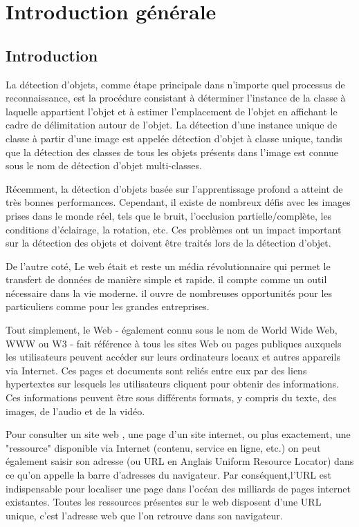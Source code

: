 \chapter*{Introduction générale}
\newpage
\pagestyle{fancy}
\fancyhead[L]{}
\renewcommand{\headrulewidth}{1pt}
\fancyfoot[C]{\thepage}


\section*{Introduction}
La détection d'objets, comme étape principale dans n'importe quel processus  de reconnaissance, est la procédure consistant à déterminer l'instance de la classe à laquelle appartient l'objet et à estimer l'emplacement de l'objet en affichant le cadre de délimitation autour de l'objet. La détection d'une instance unique de classe à partir d'une image est appelée détection d'objet à classe unique, tandis que la détection des classes de tous les objets présents dans l'image est connue sous le nom de détection d'objet multi-classes. 

Récemment, la détection d'objets basée sur l'apprentissage profond a atteint de très bonnes performances. Cependant, il existe de nombreux défis avec les images prises dans le monde réel, tels que le bruit, l'occlusion partielle/complète, les conditions d'éclairage, la rotation, etc. Ces problèmes ont un impact important sur la détection des objets et doivent être traités lors de la détection d'objet. 

De l'autre coté, Le web était et reste un média révolutionnaire qui permet le transfert de données de manière simple et rapide. il compte comme un outil nécessaire dans la vie moderne. il ouvre de nombreuses opportunités pour les particuliers comme pour les grandes entreprises. 

Tout simplement, le Web - également connu sous le nom de World Wide Web, WWW ou W3 - fait référence à tous les sites Web ou pages publiques auxquels les utilisateurs peuvent accéder sur leurs ordinateurs locaux et autres appareils via Internet. Ces pages et documents sont reliés entre eux par des liens hypertextes sur lesquels les utilisateurs cliquent pour obtenir des informations. Ces informations peuvent être sous différents formats, y compris du texte, des images, de l'audio et de la vidéo.

Pour consulter un site web , une page d'un site internet, ou plus exactement, une "ressource" disponible via Internet (contenu, service en ligne, etc.) on peut également saisir son adresse (ou URL en Anglais Uniform Resource Locator) dans ce qu’on appelle la barre d'adresses du navigateur. Par conséquent,l'URL est indispensable pour localiser une page dans l'océan des milliards de pages internet existantes.  Toutes les ressources présentes sur le web disposent d'une URL unique, c'est l'adresse web que l'on retrouve dans son navigateur.

